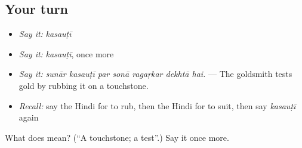 \subsection*{Your turn}
\begin{itemize}
\raggedright
  \item \emph{Say it:} \emph{kasauṭī}
  \item \emph{Say it:} \emph{kasauṭī}, once more
  \item \emph{Say it:} \emph{sunār kasauṭī par sonā ragaṛkar dekhtā hai.} — The goldsmith tests gold by rubbing it on a touchstone.
  \item \emph{Recall:} say the Hindi for to rub, then the Hindi for to suit, then say \emph{kasauṭī} again
\end{itemize}

\begin{tcolorbox}[breakable,colback=teal!4,colframe=teal!35!black,title={Before you move on}]
What does  mean? (\textquotedblleft{}A touchstone; a test\textquotedblright{}.) Say it once more.
\end{tcolorbox}
